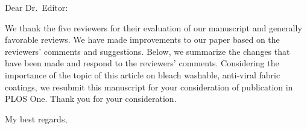 \documentclass[12pt]{letter}
\date{\today}
\begin{document}
\begin{letter}{}

\opening{Dear Dr.~Editor:}

We thank the five reviewers for their evaluation of our manuscript and generally favorable reviews.  
We have made improvements to our paper based on the reviewers' comments and suggestions.
Below, we summarize the changes that have been made and respond to the reviewers' comments.
Considering the importance of the topic of this
article on 
bleach washable, anti-viral fabric coatings,
we resubmit this manuscript for your consideration of publication in PLOS One.
Thank you for your consideration.

\closing{My best regards,}




\end{letter}







\end{document}
